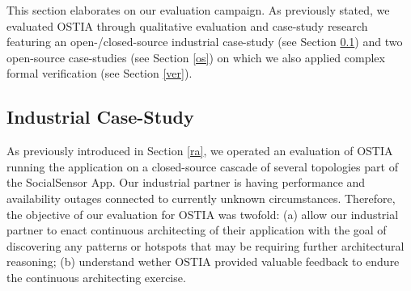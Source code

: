 
This section elaborates on our evaluation campaign. As previously stated, we evaluated OSTIA through qualitative evaluation and case-study research featuring an open-/closed-source industrial case-study (see Section \ref{cs}) and two open-source case-studies (see Section \ref{os}) on which we also applied complex formal verification (see Section \ref{ver}).

\subsection{Industrial Case-Study}\label{cs}

As previously introduced in Section \ref{ra}, we operated an evaluation of OSTIA running the application on a closed-source cascade of several topologies part of the SocialSensor App. Our industrial partner is having performance and availability outages connected to currently unknown circumstances. Therefore, the objective of our evaluation for OSTIA was twofold: (a) allow our industrial partner to enact continuous architecting of their application with the goal of discovering any patterns or hotspots that may be requiring further architectural reasoning; (b) understand wether OSTIA provided valuable feedback to endure the continuous architecting exercise.

